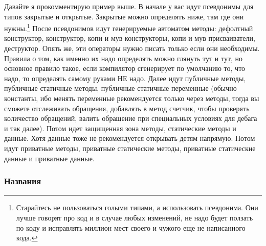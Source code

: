 \documentclass{article}
\begin{document}
Давайте я прокомментирую пример выше. В начале у вас идут псевдонимы для типов закрытые и открытые. Закрытые можно определять ниже, там где они нужны.\footnote{Старайтесь не пользоваться голыми типами, а использовать псевдонима. Они лучше говорят про код и в случае любых изменений, не надо будет ползать по коду и исправлять миллион мест своего и чужого еще не написанного кода.} После псевдонимов идут генерируемые автоматом методы: дефолтный конструктор, конструктор, копи и мув конструкторы, копи и мув присваиватели, деструктор. Опять же, эти операторы нужно писать только если они необходимы. Правила о том, как именно их надо определять можно глянуть \href{https://www.youtube.com/watch?v=vLinb2fgkHk}{тут} и \href{https://www.youtube.com/watch?v=PNRju6_yn3o}{тут}, но основное правило такое, если компилятор сгенерирует по умолчанию то, что надо, то определять самому руками НЕ надо. Далее идут публичные методы, публичные статичные методы, публичные статичные переменные (обычно константы, ибо менять переменные рекомендуется только через методы, тогда вы сможете отслеживать обращения, добавлять в метод счетчик, чтобы проверять количество обращений, валить обращение при специальных условиях для дебага и так далее). Потом идет защищенная зона методы, статические методы и данные. Хотя данные тоже не рекомендуется открывать детям напрямую. Потом идут приватные методы, приватные статические методы, приватные статические данные и приватные данные.


\subsubsection{Названия}
\end{document}
